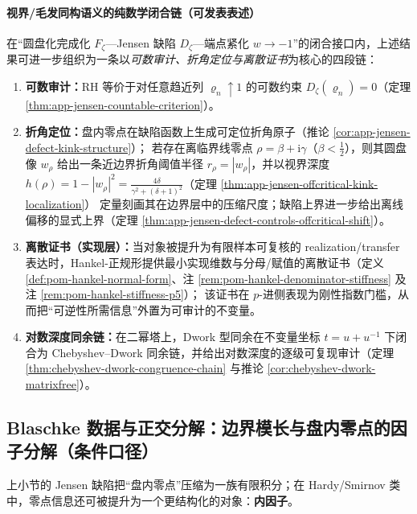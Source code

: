 \paragraph{视界/毛发同构语义的纯数学闭合链（可发表表述）}\label{par:app-jensen-horizon-hair-closed-chain}
在“圆盘化完成化 \(F_{\zeta}\)—Jensen 缺陷 \(D_{\zeta}\)—端点紧化 \(w\to-1\)”的闭合接口内，上述结果可进一步组织为一条以\emph{可数审计、折角定位与离散证书}为核心的四段链：
\begin{enumerate}
  \item \textbf{可数审计：}RH 等价于对任意趋近列 \(\varrho_n\uparrow 1\) 的可数约束 \(D_{\zeta}(\varrho_n)=0\)（定理 \ref{thm:app-jensen-countable-criterion}）。
  \item \textbf{折角定位：}盘内零点在缺陷函数上生成可定位折角原子（推论 \ref{cor:app-jensen-defect-kink-structure}）；
  若存在离临界线零点 \(\rho=\beta+\mathrm{i}\gamma\)（\(\beta<\tfrac12\)），则其圆盘像 \(w_{\rho}\) 给出一条近边界折角阈值半径 \(r_{\rho}=|w_{\rho}|\)，并以视界深度
  \(h(\rho)=1-|w_{\rho}|^{2}=\frac{4\delta}{\gamma^{2}+(\delta+1)^{2}}\)（定理 \ref{thm:app-jensen-offcritical-kink-localization}）
  定量刻画其在边界层中的压缩尺度；缺陷上界进一步给出离线偏移的显式上界（定理 \ref{thm:app-jensen-defect-controls-offcritical-shift}）。
  \item \textbf{离散证书（实现层）：}当对象被提升为有限样本可复核的 realization/transfer 表达时，Hankel-正规形提供最小实现维数与分母/赋值的离散证书（定义 \ref{def:pom-hankel-normal-form}、注 \ref{rem:pom-hankel-denominator-stiffness} 及注 \ref{rem:pom-hankel-stiffness-p5}）；
  该证书在 \(p\)-进侧表现为刚性指数门槛，从而把“可逆性所需信息”外置为可审计的不变量。
  \item \textbf{对数深度同余链：}在二幂塔上，Dwork 型同余在不变量坐标 \(t=u+u^{-1}\) 下闭合为 Chebyshev--Dwork 同余链，并给出对数深度的逐级可复现审计（定理 \ref{thm:chebyshev-dwork-congruence-chain} 与推论 \ref{cor:chebyshev-dwork-matrixfree}）。
\end{enumerate}

\subsection{Blaschke 数据与正交分解：边界模长与盘内零点的因子分解（条件口径）}\label{subsec:unit-disk-inner-outer}
上小节的 Jensen 缺陷把“盘内零点”压缩为一族有限积分；在 Hardy/Smirnov 类中，零点信息还可被提升为一个更结构化的对象：\textbf{内因子}。

